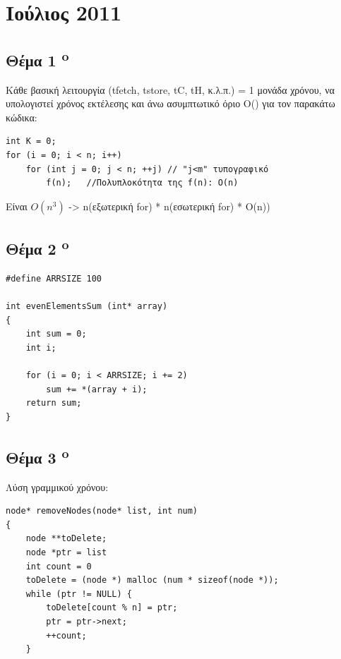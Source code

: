 \documentclass[a4paper,10pt]{article}
\begin{document}

\section{Ιούλιος 2011}

\subsection{Θέμα 1 \textsuperscript{o}}
Κάθε βασική λειτουργία (tfetch, tstore, tC, tH, κ.λ.π.) = 1 μονάδα χρόνου, να
υπολογιστεί χρόνος εκτέλεσης και άνω ασυμπτωτικό όριο Ο() για τον παρακάτω
κώδικα:

\begin{verbatim}
int K = 0;
for (i = 0; i < n; i++)
    for (int j = 0; j < n; ++j) // "j<m" τυπογραφικό
        f(n);   //Πολυπλοκότητα της f(n): O(n)
\end{verbatim}
Είναι $O(n^3)$ -> n(εξωτερική for) * n(εσωτερική for) * O(n))

\subsection{Θέμα 2 \textsuperscript{o}}
\begin{verbatim}
#define ARRSIZE 100

int evenElementsSum (int* array)
{
    int sum = 0;
    int i;

    for (i = 0; i < ARRSIZE; i += 2)
        sum += *(array + i);
    return sum;
}
\end{verbatim}


\subsection{Θέμα 3 \textsuperscript{o}}
Λύση γραμμικού χρόνου:
\begin{verbatim}
node* removeNodes(node* list, int num)
{
    node **toDelete;
    node *ptr = list
    int count = 0
    toDelete = (node *) malloc (num * sizeof(node *));
    while (ptr != NULL) {
        toDelete[count % n] = ptr;
        ptr = ptr->next;
        ++count;
    }
\end{verbatim}


\end{document}
